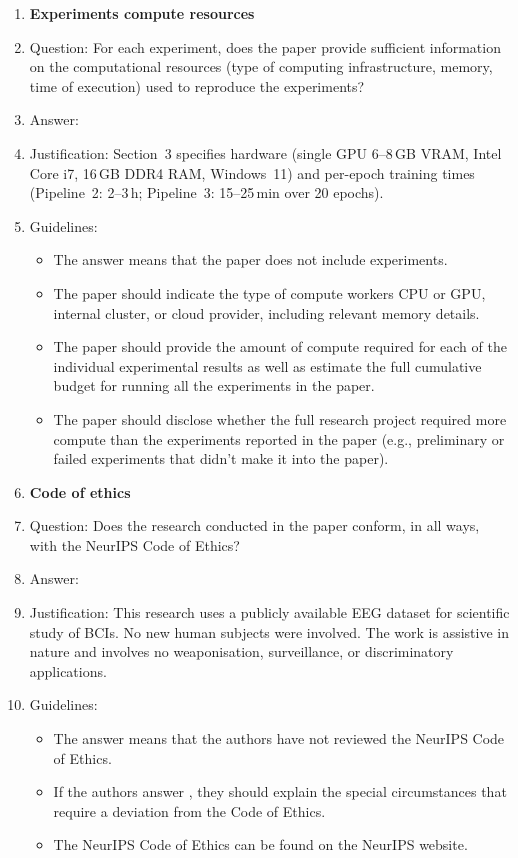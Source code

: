 \documentclass{article}
\begin{document}
\begin{enumerate}
\item {\bf Experiments compute resources}
    \item[] Question: For each experiment, does the paper provide sufficient information on the computational resources (type of computing infrastructure, memory, time of execution) used to reproduce the experiments?
    \item[] Answer: \answerYes{}
    \item[] Justification: Section~3 specifies hardware (single GPU 6--8\,GB VRAM, Intel Core i7, 16\,GB DDR4 RAM, Windows~11) and per-epoch training times (Pipeline~2: 2--3\,h; Pipeline~3: 15--25\,min over 20 epochs).
    \item[] Guidelines:
    \begin{itemize}
        \item The answer \answerNA{} means that the paper does not include experiments.
        \item The paper should indicate the type of compute workers CPU or GPU, internal cluster, or cloud provider, including relevant memory details.
        \item The paper should provide the amount of compute required for each of the individual experimental results as well as estimate the full cumulative budget for running all the experiments in the paper.
        \item The paper should disclose whether the full research project required more compute than the experiments reported in the paper (e.g., preliminary or failed experiments that didn't make it into the paper).
    \end{itemize}

\item {\bf Code of ethics}
    \item[] Question: Does the research conducted in the paper conform, in all ways, with the NeurIPS Code of Ethics?
    \item[] Answer: \answerYes{}
    \item[] Justification: This research uses a publicly available EEG dataset for scientific study of BCIs. No new human subjects were involved. The work is assistive in nature and involves no weaponisation, surveillance, or discriminatory applications.
    \item[] Guidelines:
    \begin{itemize}
        \item The answer \answerNA{} means that the authors have not reviewed the NeurIPS Code of Ethics.
        \item If the authors answer \answerNo{}, they should explain the special circumstances that require a deviation from the Code of Ethics.
        \item The NeurIPS Code of Ethics can be found on the NeurIPS website.
    \end{itemize}


\end{enumerate}
\end{document}
